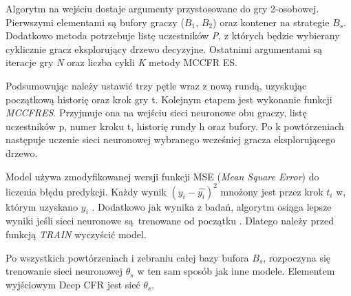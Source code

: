 \documentclass[12pt,oneside,a4paper]{report}
\begin{document}
\vspace{1cm}
Algorytm na wejściu dostaje argumenty przystosowane do gry 2-osobowej.
Pierwszymi elementami są bufory graczy ($B_{1}$, $B_{2}$) oraz kontener na 
strategie $B_{s}$.
Dodatkowo metoda potrzebuje listę uczestników \emph{P}, z których będzie wybierany cyklicznie gracz
eksplorujący drzewo decyzyjne.
Ostatnimi argumentami są iteracje gry \emph{N} oraz liczba cykli \emph{K} metody MCCFR ES.


Podsumowując należy ustawić trzy pętle wraz z nową rundą, uzyskując początkową historię oraz
krok gry t. Kolejnym etapem jest
wykonanie funkcji \emph{MCCFRES}. Przyjmuje ona na wejściu sieci neuronowe obu graczy, 
listę uczestników p,
numer kroku t, historię rundy h oraz bufory. Po k 
powtórzeniach następuje uczenie sieci neuronowej wybranego wcześniej gracza eksplorującego drzewo. 

Model używa 
zmodyfikowanej wersji funkcji MSE (\emph{Mean Square Error}) do liczenia błędu predykcji. Każdy wynik $(y_{i} - \hat{y_{i}})^2$
mnożony jest przez krok $t_{i}$ w, którym uzyskano $y_{i}$ \cite{DCFR}.
Dodatkowo jak wynika z badań, algorytm osiąga lepsze wyniki
jeśli
sieci neuronowe są trenowane od początku \cite{DCFR}. Dlatego należy przed funkcją \emph{TRAIN}
wyczyścić model.

Po wszystkich powtórzeniach i zebraniu całej bazy bufora $B_{s}$, rozpoczyna się trenowanie sieci 
neuronowej $\theta_{s}$ w ten sam sposób jak inne modele. Elementem wyjściowym Deep CFR jest sieć 
$\theta_{s}$.
\end{document}
